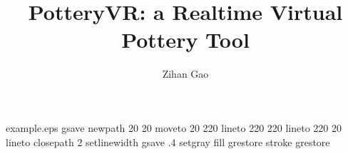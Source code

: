%
%
%
%
%
\begin{filecontents*}{example.eps}
gsave
newpath
  20 20 moveto
  20 220 lineto
  220 220 lineto
  220 20 lineto
closepath
2 setlinewidth
gsave
  .4 setgray fill
grestore
stroke
grestore
\end{filecontents*}
%
\RequirePackage{fix-cm}
%
\documentclass[smallextended]{svjour3}       %
%
\smartqed  %
%
\usepackage{graphicx}
\usepackage{amsmath}
%
%
%
%
%


\title{PotteryVR: a Realtime Virtual Pottery Tool%
}


\author{Zihan Gao         %
}


